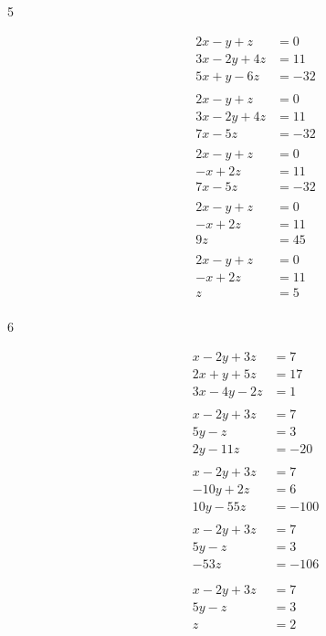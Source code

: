 \documentclass[fleqn,addpoints]{exam}
\begin{document}
\begin{description}
\item[5]
\begin{align*}
  2x - y + z &= 0 \\
  3x - 2y + 4z &= 11 \\
  5x + y - 6z &= -32 \\
\\
  2x - y + z &= 0 \\
  3x - 2y + 4z &= 11 \\
  7x  - 5z &= -32 \\
\\
  2x - y + z &= 0 \\
  -x + 2z &= 11 \\
  7x  - 5z &= -32 \\
\\
  2x - y + z &= 0 \\
  -x + 2z &= 11 \\
  9z &= 45 \\ 
\\
  2x - y + z &= 0 \\
  -x + 2z &= 11 \\
  z &= 5 \\ 
\end{align*}


\item[6]
\begin{align*}
  x-2y+3z &= 7 \\
  2x+y+5z &= 17 \\
  3x-4y-2z &= 1 \\
\\
  x-2y+3z &= 7 \\
  5y - z &= 3 \\
  2y - 11z &= -20 \\
\\
  x-2y+3z &= 7 \\
  -10y + 2z &= 6 \\
  10y - 55z &= -100 \\
\\
  x-2y+3z &= 7 \\
  5y - z &= 3 \\
   -53z &= -106 \\
\\
\\
  x-2y+3z &= 7 \\
  5y - z &= 3 \\
   z &= 2 \\
\\
\end{align*}


\end{description}
\end{document}
